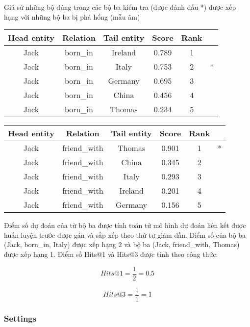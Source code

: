    Giả sử những bộ đúng trong các bộ ba kiểm tra (được đánh dấu *) được xếp hạng với những bộ ba bị phá hổng (mẫu âm)

    \begin{table}[H]
    \centering
    \begin{tabular}{cccccc}
    \hline
    Head entity &  Relation & Tail entity & Score & Rank & \\
    \hline
    Jack &  born\_in &  Ireland    &    0.789   &   1&\\
    Jack &  born\_in &  Italy      &    0.753    &  2&  *\\
    Jack &  born\_in &  Germany    &    0.695    &  3&\\
    Jack &  born\_in &  China      &    0.456    &  4&\\
    Jack &  born\_in &  Thomas     &    0.234    &  5&\\
    \hline
    \end{tabular}
    \end{table}

    \begin{table}[H]
    \centering
    \begin{tabular}{cccccc}
    \hline
    Head entity &  Relation & Tail entity & Score & Rank & \\
    \hline
    Jack &  friend\_with &  Thomas  &   0.901  &    1& *\\
    Jack &  friend\_with &  China    &  0.345  &    2&\\
    Jack &  friend\_with &  Italy    &  0.293  &    3&\\
    Jack &  friend\_with &  Ireland  &  0.201  &    4&\\
    Jack &  friend\_with &  Germany  &  0.156  &    5&\\
    \hline
    \end{tabular}
    \end{table}

    Điểm số dự đoán của từ bộ ba được tính toán tử mô hình dự đoán liên kết được huấn luyện trước được gán và sắp xếp theo thứ tự giảm dần. Điểm số của bộ ba (Jack, born\_in, Italy) được xếp hạng 2 và bộ ba (Jack, friend\_with, Thomas) được xếp hạng 1. Điểm số Hits@1 và Hits@3 được tính theo công thức:

    $$
    Hits@1 = \frac{1}{2} = 0.5
    $$

    $$
    Hits@3 = \frac{1}{1} = 1
    $$

\subsubsection{Settings}

